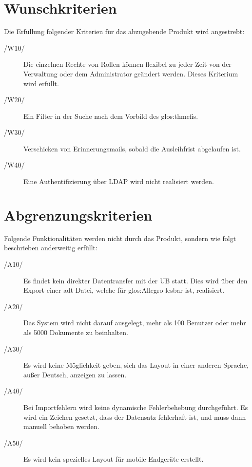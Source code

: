 \section{Wunschkriterien}
Die Erfüllung folgender Kriterien für das abzugebende Produkt wird angestrebt:
\begin{description}
  \item[/W10/] Die einzelnen Rechte von Rollen können flexibel zu jeder Zeit
	von der Verwaltung oder dem Administrator geändert werden. Dieses
	Kriterium wird erfüllt.
  \item[/W20/] Ein Filter in der Suche nach dem Vorbild des \gls{glos:thmefi}s.
  \item[/W30/] Verschicken von Erinnerungsmails, sobald die Ausleihfrist
	abgelaufen ist.
  \item[/W40/] Eine Authentifizierung über \gls{LDAP} wird nicht realisiert werden.
\end{description}

\section{Abgrenzungskriterien}
Folgende Funktionalitäten werden nicht durch das Produkt, sondern wie folgt
beschrieben anderweitig erfüllt:
\begin{description}
\item[/A10/] Es findet kein direkter Datentransfer mit der \gls{UB} statt.
	Dies wird über den Export einer adt-Datei, welche für \gls{glos:Allegro}
	lesbar ist, realisiert.
  \item[/A20/] Das System wird nicht darauf ausgelegt, mehr als 100 Benutzer
	oder mehr als 5000 Dokumente zu beinhalten.
  \item[/A30/] Es wird keine Möglichkeit geben, sich das Layout in einer anderen
	Sprache, außer Deutsch, anzeigen zu lassen.
  \item[/A40/] Bei Importfehlern wird keine dynamische Fehlerbehebung 
	durchgeführt. Es wird ein Zeichen gesetzt, dass der Datensatz fehlerhaft
	ist, und muss dann manuell behoben werden.
  \item[/A50/] Es wird kein spezielles Layout für mobile Endgeräte erstellt.
\end{description}
